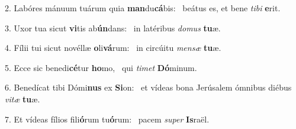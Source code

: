 2. Labóres mánuum tuárum quia \textbf{man}du\textbf{cá}bis: \ast\  beátus es, et bene \textit{ti}\textit{bi} \textbf{e}rit.\

3. Uxor tua sicut \textbf{vi}tis ab\textbf{ún}dans: \ast\  in latéribus \textit{do}\textit{mus} \textbf{tu}æ.\

4. Fílii tui sicut novéllæ \textbf{o}li\textbf{vá}rum: \ast\  in circúitu \textit{men}\textit{sæ} \textbf{tu}æ.\

5. Ecce sic benedi\textbf{cé}tur \textbf{ho}mo, \ast\  qui \textit{ti}\textit{met} \textbf{Dó}minum.\

6. Benedícat tibi Dómi\textbf{nus} ex \textbf{Si}on: \ast\  et vídeas bona Jerúsalem ómnibus diébus \textit{vi}\textit{tæ} \textbf{tu}æ.\

7. Et vídeas fílios fili\textbf{ó}rum tu\textbf{ó}rum: \ast\  pacem \textit{su}\textit{per} \textbf{Is}raël.\

